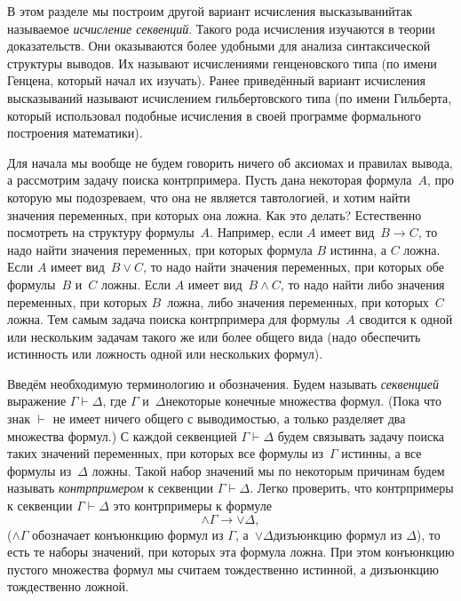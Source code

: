 В этом разделе мы построим другой вариант исчисления
высказываний\т так называемое \emph{исчисление секвенций}.%
Такого рода исчисления изучаются в теории доказательств. Они
оказываются более удобными для анализа синтаксической структуры
выводов. Их называют исчислениями генценовского типа%
(по имени
Генцена,%
который начал их изучать). Ранее приведённый вариант
исчисления высказываний называют исчислением гильбертовского
типа%
(по имени Гильберта,%
который использовал подобные
исчисления в своей программе формального построения математики).

Для начала мы вообще не будем говорить ничего об аксиомах и
правилах вывода, а рассмотрим задачу поиска контрпримера. Пусть
дана некоторая формула~$A$, про которую мы подозреваем, что она
не является тавтологией, и хотим найти значения переменных, при
которых она ложна. Как это делать? Естественно посмотреть на
структуру формулы~$A$. Например, если $A$ имеет вид~$B\to C$, то
надо найти значения переменных, при которых формула $B$ истинна,
а $C$ ложна. Если $A$ имеет вид~$B\lor C$, то надо найти
значения переменных, при которых обе формулы~$B$ и~$C$ ложны.
Если $A$ имеет вид~$B\land C$, то надо найти либо значения
переменных, при которых $B$~ложна, либо значения переменных, при
которых~$C$ ложна. Тем самым задача поиска контрпримера для
формулы~$A$ сводится к одной или нескольким задачам такого же или более
общего вида (надо обеспечить истинность или ложность одной или
нескольких формул).

Введём необходимую терминологию и обозначения. Будем называть
\emph{секвенцией}%
выражение $\Gamma\vdash\Delta$, где $\Gamma$
и~$\Delta$\т некоторые конечные множества формул. (Пока что знак
$\vdash$ не имеет ничего общего с выводимостью, а только
разделяет два множества формул.) С каждой секвенцией $\Gamma\vdash\Delta$
будем связывать задачу поиска таких значений переменных, при
которых все формулы из~$\Gamma$ истинны, а все формулы из~$\Delta$
ложны. Такой набор значений мы по некоторым причинам будем
называть \emph{контрпримером}%
к секвенции $\Gamma\vdash\Delta$.
Легко проверить, что контрпримеры к секвенции $\Gamma\vdash\Delta$\т
это контрпримеры к формуле
       $$\land \Gamma\to\lor\Delta,$$
($\land\Gamma$ обозначает конъюнкцию формул из $\Gamma$,
а~$\lor\Delta$\т дизъюнкцию формул из $\Delta$), то есть те наборы
значений, при которых эта формула ложна. При этом конъюнкцию пустого
множества формул мы считаем тождественно истинной, а дизъюнкцию\т
тождественно ложной.

